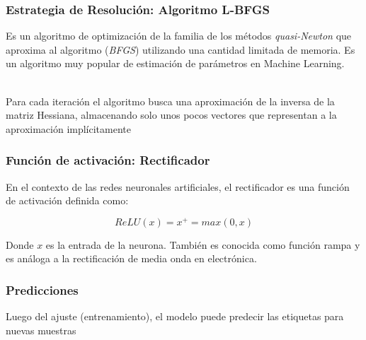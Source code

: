 \documentclass{beamer}
\begin{document}
    \begin{frame}
        \frametitle{Estrategia de Resolución: Algoritmo L-BFGS}

        \hspace*{20pt}Es un algoritmo de optimización de la familia de los métodos \textit{quasi-Newton} que aproxima al algoritmo 
        (\textit{BFGS}) utilizando una cantidad limitada de memoria. Es un algoritmo muy popular de estimación de parámetros en Machine Learning.\\~\

        \hspace*{20pt}Para cada iteración el algoritmo busca una aproximación de la inversa de la matriz Hessiana, almacenando solo unos pocos
        vectores que representan a la aproximación implícitamente

    \end{frame}

    \begin{frame}
        \frametitle{Función de activación: Rectificador}

        \hspace*{20pt}En el contexto de las redes neuronales artificiales, el rectificador es una función de activación definida 
        como:

        \begin{equation}
            ReLU(x) = x^+ = max(0, x)
        \end{equation}

        \hspace*{20pt}Donde $x$ es la entrada de la neurona. También es conocida como función rampa y es análoga a la rectificación de 
        media onda en electrónica.
    \end{frame}

    \begin{frame}
        \frametitle{Predicciones}

        \hspace*{20pt}Luego del ajuste (entrenamiento), el modelo puede predecir las etiquetas para nuevas muestras
        \vspace*{10pt}

        \resizebox{9cm}{!}{
            
        }

    \end{frame}
\end{document}
